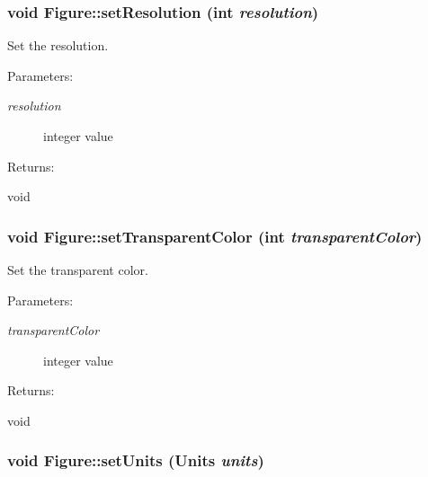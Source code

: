 \subsubsection{\setlength{\rightskip}{0pt plus 5cm}void Figure::set\-Resolution (int {\em resolution})\hspace{0.3cm}{\tt  [inline]}}\label{classFigure_a9}


Set the resolution. \begin{Desc}
\item[Parameters: ]\par
\begin{description}
\item[{\em 
resolution}]integer value \end{description}
\end{Desc}
\begin{Desc}
\item[Returns: ]\par
void \end{Desc}
\subsubsection{\setlength{\rightskip}{0pt plus 5cm}void Figure::set\-Transparent\-Color (int {\em transparent\-Color})\hspace{0.3cm}{\tt  [inline]}}\label{classFigure_a8}


Set the transparent color. \begin{Desc}
\item[Parameters: ]\par
\begin{description}
\item[{\em 
transparent\-Color}]integer value \end{description}
\end{Desc}
\begin{Desc}
\item[Returns: ]\par
void \end{Desc}
\subsubsection{\setlength{\rightskip}{0pt plus 5cm}void Figure::set\-Units ({\bf Units} {\em units})\hspace{0.3cm}{\tt  [inline]}}\label{classFigure_a4}


